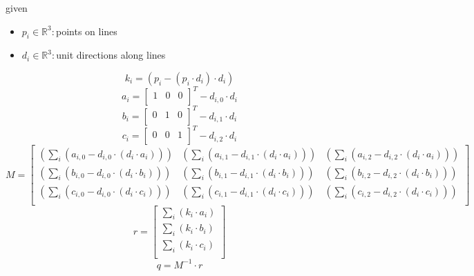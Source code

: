 \documentclass[12pt]{article}
\begin{document}
given
\begin{itemize}
\item $p_{i} \in \mathbb{R}^{ 3}:$points on lines
\item $d_{i} \in \mathbb{R}^{ 3}:$unit directions along lines
\end{itemize}

\[
k_{i} = (p_{ i } - (p_{ i } \cdot d_{ i }) \cdot d_{ i })
\]
\[
a_{i} = \begin{bmatrix}
1 & 0 & 0\\
\end{bmatrix}^T - d_{ i, 0 } \cdot d_{ i }
\]
\[
b_{i} = \begin{bmatrix}
0 & 1 & 0\\
\end{bmatrix}^T - d_{ i, 1 } \cdot d_{ i }
\]
\[
c_{i} = \begin{bmatrix}
0 & 0 & 1\\
\end{bmatrix}^T - d_{ i, 2 } \cdot d_{ i }
\]
\[
M = \begin{bmatrix}
(\sum_i (a_{ i, 0 } - d_{ i, 0 } \cdot (d_{ i } \cdot a_{ i }))) & (\sum_i (a_{ i, 1 } - d_{ i, 1 } \cdot (d_{ i } \cdot a_{ i }))) & (\sum_i (a_{ i, 2 } - d_{ i, 2 } \cdot (d_{ i } \cdot a_{ i })))\\
(\sum_i (b_{ i, 0 } - d_{ i, 0 } \cdot (d_{ i } \cdot b_{ i }))) & (\sum_i (b_{ i, 1 } - d_{ i, 1 } \cdot (d_{ i } \cdot b_{ i }))) & (\sum_i (b_{ i, 2 } - d_{ i, 2 } \cdot (d_{ i } \cdot b_{ i })))\\
(\sum_i (c_{ i, 0 } - d_{ i, 0 } \cdot (d_{ i } \cdot c_{ i }))) & (\sum_i (c_{ i, 1 } - d_{ i, 1 } \cdot (d_{ i } \cdot c_{ i }))) & (\sum_i (c_{ i, 2 } - d_{ i, 2 } \cdot (d_{ i } \cdot c_{ i })))\\
\end{bmatrix}
\]
\[
r = \begin{bmatrix}
\sum_i (k_{ i } \cdot a_{ i })\\
\sum_i (k_{ i } \cdot b_{ i })\\
\sum_i (k_{ i } \cdot c_{ i })\\
\end{bmatrix}
\]
\[
q = M^{-1} \cdot r
\]
\end{document}
